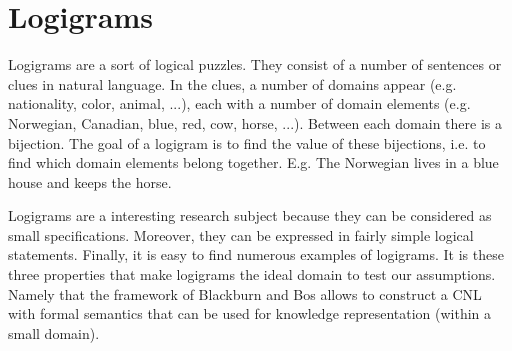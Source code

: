 \section{Logigrams}
Logigrams are a sort of logical puzzles. They consist of a number of sentences or clues in natural language. In the clues, a number of domains appear (e.g. nationality, color, animal, ...), each with a number of domain elements (e.g. Norwegian, Canadian, blue, red, cow, horse, ...). Between each domain there is a bijection. The goal of a logigram is to find the value of these bijections, i.e. to find which domain elements belong together. E.g. The Norwegian lives in a blue house and keeps the horse.

Logigrams are a interesting research subject because they can be considered as small specifications. Moreover, they can be expressed in fairly simple logical statements. Finally, it is easy to find numerous examples of logigrams. It is these three properties that make logigrams the ideal domain to test our assumptions. Namely that the framework of Blackburn and Bos allows to construct a CNL with formal semantics that can be used for knowledge representation (within a small domain).

